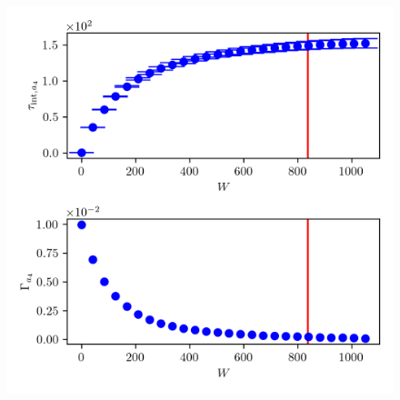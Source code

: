 \begin{figure}[ht!]
	\centering
	\includegraphics{UwerrTauIntTWalk10.png}
	\caption[]{}
	\label{fig:}
\end{figure}


